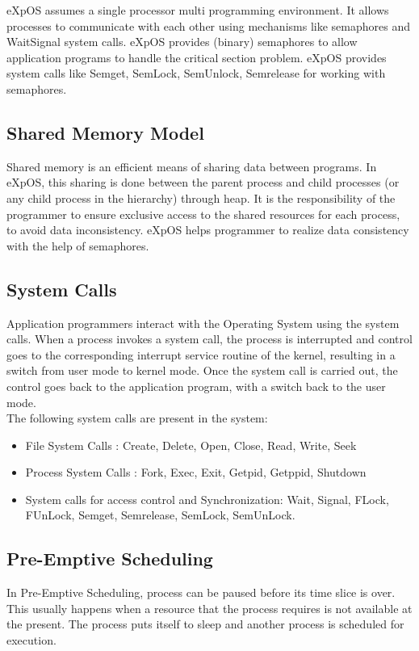\documentclass[11pt ,twosided]{article}
\begin{document}
eXpOS assumes a single processor multi programming environment. It allows processes to communicate with each other using mechanisms like semaphores and Wait\-Signal system calls.
eXpOS provides (binary) semaphores to allow application programs to handle the critical section problem. eXpOS provides system calls like Semget, SemLock, SemUnlock, Semrelease for working with semaphores.
\subsection{Shared Memory Model}

Shared memory is an efficient means of sharing data between programs. In eXpOS, this sharing is done between the parent process and child processes (or any child process in the hierarchy) through heap. It is the responsibility of the programmer to ensure exclusive access to the shared resources for each process, to avoid data inconsistency. eXpOS helps programmer to realize data consistency with the help of semaphores. 
\subsection{System Calls}

Application programmers interact with the Operating System using the system calls. When a process invokes a system call, the process is interrupted and control goes to the corresponding interrupt service routine of the kernel, resulting in a switch from user mode to kernel mode. Once the system call is carried out, the control goes back to the application program, with a switch back to the user mode.\\
The following system calls are present in the system: 
\begin{itemize}
\item File System Calls : Create, Delete, Open, Close, Read, Write, Seek
\item Process System Calls : Fork, Exec, Exit, Getpid, Getppid, Shutdown
\item System calls for access control and Synchronization: Wait, Signal, FLock, FUnLock, Semget, Semrelease, SemLock, SemUnLock.
\end{itemize}

\subsection{Pre-Emptive Scheduling}

In Pre-Emptive Scheduling, process can be paused before its time slice is over. This usually happens when a resource that the process requires is not available at the present. The process puts itself to sleep and another process is scheduled for execution.
\end{document}
